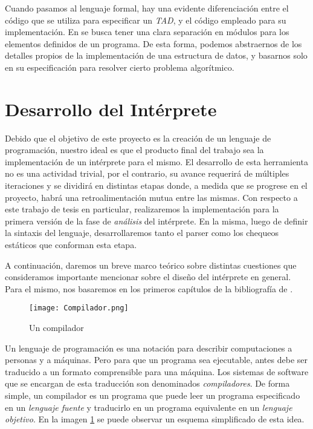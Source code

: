 Cuando pasamos al lenguaje formal, hay una evidente diferenciación entre el código que se utiliza para especificar un \textit{TAD}, y el código empleado para su implementación.
En \Lenguaje{} se busca tener una clara separación en módulos para los elementos definidos de un programa.
De esta forma, podemos abstraernos de los detalles propios de la implementación de una estructura de datos, y basarnos solo en su especificación para resolver cierto problema algorítmico.

\section{Desarrollo del Intérprete}

Debido que el objetivo de este proyecto es la creación de un lenguaje de programación, nuestro ideal es que el producto final del trabajo sea la implementación de un intérprete para el mismo.
El desarrollo de esta herramienta no es una actividad trivial, por el contrario, su avance requerirá de múltiples iteraciones y se dividirá en distintas etapas donde, a medida que se progrese en el proyecto, habrá una retroalimentación mutua entre las mismas.
Con respecto a este trabajo de tesis en particular, realizaremos la implementación para la primera versión de la fase de \textit{análisis} del intérprete.
En la misma, luego de definir la sintaxis del lenguaje, desarrollaremos tanto el parser como los chequeos estáticos que conforman esta etapa.

A continuación, daremos un breve marco teórico sobre distintas cuestiones que consideramos importante mencionar sobre el diseño del intérprete en general.
Para el mismo, nos basaremos en los primeros capítulos de la bibliografía de \cite{Dragon}.

\begin{figure}[h]
\centering
\texttt{[image: Compilador.png]}
\caption{Un compilador}
\label{Compilador}
\end{figure}

Un lenguaje de programación es una notación para describir computaciones a personas y a máquinas.
Pero para que un programa sea ejecutable, antes debe ser traducido a un formato comprensible para una máquina.
Los sistemas de software que se encargan de esta traducción son denominados \textit{compiladores}.
De forma simple, un compilador es un programa que puede leer un programa especificado en un \textit{lenguaje fuente} y traducirlo en un programa equivalente en un \textit{lenguaje objetivo}.
En la imagen \ref{Compilador} se puede observar un esquema simplificado de esta idea.

